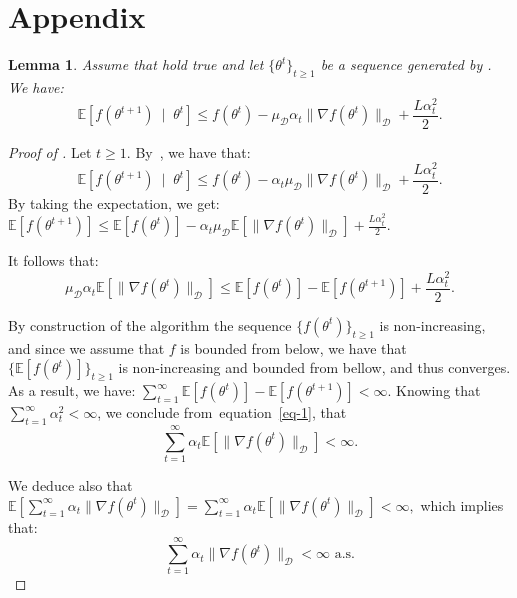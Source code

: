 \documentclass{article} %
\def\eqref#1{equation~\ref{#1}}
\newtheorem{lemma}{Lemma}
\begin{document}



\appendix
\section{Appendix}
\begin{lemma}\label{Lemma1} \textbf{\cite[Lemma 3.5]{bergou2020stochastic}}
Assume that  hold true and let $\{\theta^t\}_{t \ge 1}$ be a sequence generated by . We have:
    $$
    \mathbb{E}[f(\theta^{t+1})  \: \mid \; \theta^t  ]
   \le f(\theta^t) - \mu_{\mathcal{D}} \alpha_t \lVert \nabla f(\theta^t) \rVert_{\mathcal{D}} + \frac{L\alpha_t^2 }{2}.$$

\end{lemma}
\vspace{0.1cm}

\begin{proof}[Proof of ]

Let $t \ge 1$. By~, we have that: 
$$
    \mathbb{E}[f(\theta^{t+1})  \: \mid \; \theta^t  ]
   \le f(\theta^t) - \alpha_t\mu_{\mathcal{D}} \lVert \nabla f(\theta^t) \rVert_{\mathcal{D}} + \frac{L\alpha_t^2  }{2}.
$$ 
By taking the expectation, we get:
$
    \mathbb{E}[f(\theta^{t+1}) ]
   \le \mathbb{E}[f(\theta^t)] - \alpha_t\mu_{\mathcal{D}} \mathbb{E}[\lVert \nabla f(\theta^t) \rVert_{\mathcal{D}}] + \frac{L\alpha_t^2  }{2}.
$ 

It follows that: 
\begin{equation}\label{eq-1}
 \mu_{\mathcal{D}}  \alpha_t \mathbb{E}[\lVert \nabla f(\theta^t) \rVert_\mathcal{D}] \le \mathbb{E}[f(\theta^{t}) ]-\mathbb{E}[f(\theta^{t+1}) ]  + \frac{L\alpha_t^2  }{2}. 
\end{equation}

By construction of the algorithm the sequence $\{f(\theta^{t})\}_{t\ge 1}$ is non-increasing, and since we assume that $f$ is bounded from below, we have that 
$\{\mathbb{E}[f(\theta^{t})]\}_{t \ge  1}$ is non-increasing and bounded from bellow, and thus converges. As a result, we have: 
$\sum_{t=1}^{\infty} \mathbb{E}[f(\theta^{t}) ]-\mathbb{E}[f(\theta^{t+1}) ]<\infty$. 
Knowing that $\sum_{t=1}^{\infty}\alpha_t^2 < \infty$, we conclude from~\eqref{eq-1}, that 
$$ \sum_{t=1}^{\infty} \alpha_t  \mathbb{E}\left[ \lVert \nabla f(\theta^t) \rVert_{\mathcal{D}}\right] <\infty.$$


We deduce also that 
$
\mathbb{E}\left[\sum_{t=1}^{\infty} \alpha_t \lVert \nabla f(\theta^t) \rVert_\mathcal{D} \right]  =\sum_{t=1}^{\infty} \alpha_t \mathbb{E}\left[ \lVert \nabla f(\theta^t) \rVert_{\mathcal{D}}\right] <\infty,$ which implies that:
$$
\sum_{t=1}^{\infty} \alpha_t \lVert \nabla f(\theta^t) \rVert_\mathcal{D} < \infty \text{ a.s.} 
$$
\end{proof}
\end{document}
